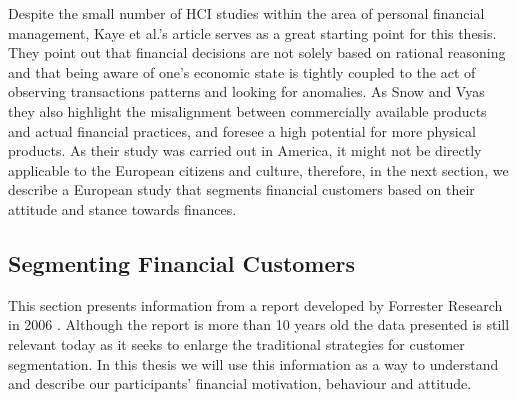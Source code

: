 Despite the small number of HCI studies within the area of personal financial management, Kaye et al.’s article serves as a great starting point for this thesis. They point out that financial decisions are not solely based on rational reasoning and that being aware of one’s economic state is tightly coupled to the act of observing transactions patterns and looking for anomalies. As Snow and Vyas \cite{snow2015fixing} they also highlight the misalignment between commercially available products and actual financial practices, and foresee a high potential for more physical products. As their study was carried out in America, it might not be directly applicable to the European citizens and culture, therefore, in the next section, we describe a European study that segments financial customers based on their attitude and stance towards finances.

\subsection{Segmenting Financial Customers}
\label{sec:segmenting-financial-customers}
This section presents information from a report developed by Forrester Research in 2006 \cite{ensor2006segmenting}. Although the report is more than 10 years old the data presented is still relevant today as it seeks to enlarge the traditional strategies for customer segmentation. In this thesis we will use this information as a way to understand and describe our participants’ financial motivation, behaviour and attitude.\\

